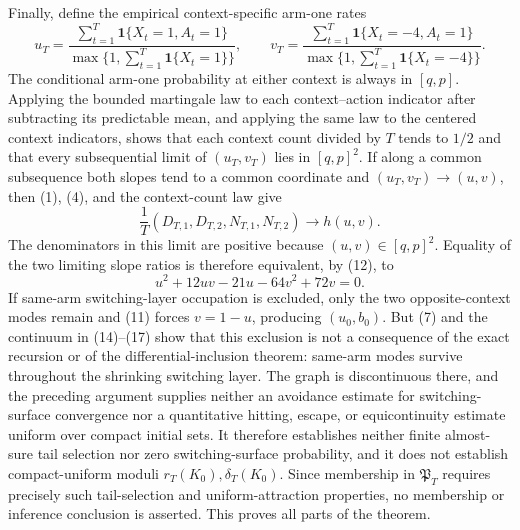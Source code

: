 Finally, define the empirical context-specific arm-one rates
\[
 u_T=\frac{\sum_{t=1}^T\mathbf1\{X_t=1,A_t=1\}}
 {\max\{1,\sum_{t=1}^T\mathbf1\{X_t=1\}\}},\qquad
 v_T=\frac{\sum_{t=1}^T\mathbf1\{X_t=-4,A_t=1\}}
 {\max\{1,\sum_{t=1}^T\mathbf1\{X_t=-4\}\}}.
\]
The conditional arm-one probability at either context is always in \([q,p]\). Applying the bounded martingale law to each context--action indicator after subtracting its predictable mean, and applying the same law to the centered context indicators, shows that each context count divided by \(T\) tends to \(1/2\) and that every subsequential limit of \((u_T,v_T)\) lies in \([q,p]^2\). If along a common subsequence both slopes tend to a common coordinate and \((u_T,v_T)\to(u,v)\), then (1), (4), and the context-count law give
\[
 \frac1T(D_{T,1},D_{T,2},N_{T,1},N_{T,2})\longrightarrow h(u,v).
\]
The denominators in this limit are positive because \((u,v)\in[q,p]^2\). Equality of the two limiting slope ratios is therefore equivalent, by (12), to
\[
 u^2+12uv-21u-64v^2+72v=0.
\]
If same-arm switching-layer occupation is excluded, only the two opposite-context modes remain and (11) forces \(v=1-u\), producing \((u_0,b_0)\). But (7) and the continuum in (14)--(17) show that this exclusion is not a consequence of the exact recursion or of the differential-inclusion theorem: same-arm modes survive throughout the shrinking switching layer. The graph is discontinuous there, and the preceding argument supplies neither an avoidance estimate for switching-surface convergence nor a quantitative hitting, escape, or equicontinuity estimate uniform over compact initial sets. It therefore establishes neither finite almost-sure tail selection nor zero switching-surface probability, and it does not establish compact-uniform moduli \(r_T(K_0),\delta_T(K_0)\). Since membership in \(\mathfrak P_T\) requires precisely such tail-selection and uniform-attraction properties, no membership or inference conclusion is asserted. This proves all parts of the theorem.